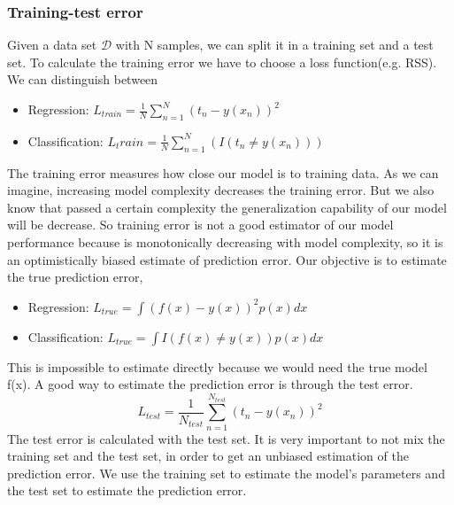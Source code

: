 \documentclass[../main.tex]{subfiles}
\begin{document}
\subsubsection{Training-test error}
Given a data set $\mathcal{D}$ with N samples, we can split it in a training set and a test set.
To calculate the training error we have to choose a loss function(e.g. RSS).
We can distinguish between
\begin{itemize}
    \item Regression: $L_{train} = \frac{1}{N} \sum_{n=1}^N (t_n - y(x_n))^2$
    \item Classification: $L_train = \frac{1}{N} \sum_{n=1}^N (I(t_n \neq y(x_n)))$
\end{itemize}
The training error measures how close our model is to training data. As we can imagine, increasing model complexity decreases the training error. But we also know that passed a certain complexity the generalization capability of our model will be decrease. So training error is not a good estimator of our model performance because is monotonically decreasing with model complexity, so it is an optimistically biased estimate of prediction error.
Our objective is to estimate the true prediction error,
\begin{itemize}
    \item Regression: $L_{true} = \int (f(x) - y(x))^2 p(x)dx$
    \item Classification: $L_{true} = \int I(f(x) \neq y(x)) p(x)dx$
\end{itemize}
This is impossible to estimate directly because we would need the true model f(x). A good way to estimate the prediction error is through the test error.
\begin{equation}
    L_{test} = \frac{1}{N_{test}} \sum_{n=1}^{N_{test}} (t_n - y(x_n))^2
\end{equation}
The test error is calculated with the test set. It is very important to not mix the training set and the test set, in order to get an unbiased estimation of the prediction error.
We use the training set to estimate the model's parameters and the test set to estimate the prediction error.
\end{document}
